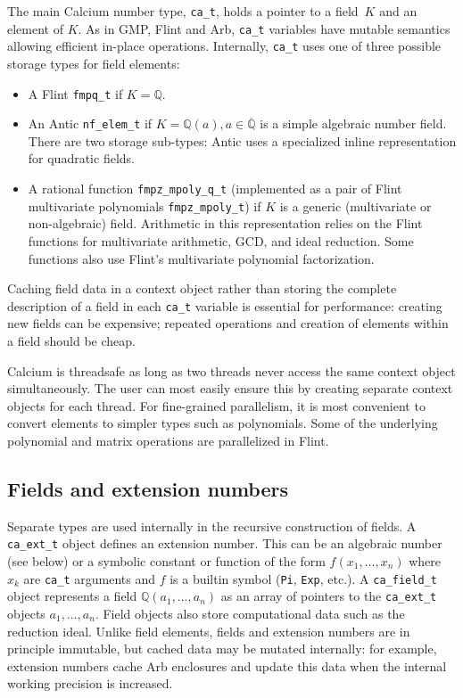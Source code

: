 \documentclass[11pt,a4paper]{article}
\begin{document}
The main Calcium number type, \texttt{ca\_t}, holds a pointer
to a field~$K$ and an element of $K$.
As in GMP, Flint and Arb, \texttt{ca\_t} variables have mutable semantics
allowing efficient in-place operations.
Internally, \texttt{ca\_t} uses one of three possible storage types
for field elements:
\begin{itemize}
\item A Flint \texttt{fmpq\_t} if $K = \mathbb{Q}$.
\item An Antic \texttt{nf\_elem\_t} if $K = \mathbb{Q}(a), a \in \overline{\mathbb{Q}}$ is a simple algebraic number field. There are two storage sub-types: Antic uses a specialized inline representation for quadratic fields.
\item A rational function \texttt{fmpz\_mpoly\_q\_t} (implemented as a pair of Flint multivariate polynomials \texttt{fmpz\_mpoly\_t}) if $K$ is a generic (multivariate or non-algebraic) field. Arithmetic in this representation relies on the Flint functions for multivariate arithmetic, GCD, and ideal reduction. Some functions also use Flint's multivariate polynomial factorization.
\end{itemize}

Caching field data in a context object rather than storing the
complete description of a field in each \texttt{ca\_t} variable
is essential for performance: creating new fields can be
expensive; repeated operations and creation of elements within a field
should be cheap.


Calcium is threadsafe as long as two threads never
access the same context object simultaneously. The user can most easily
ensure this by creating separate context objects for each thread.
For fine-grained parallelism, it is most convenient to
convert elements to simpler types such as polynomials.
Some of the underlying polynomial and matrix operations
are parallelized in Flint.


\subsection{Fields and extension numbers}

Separate types are used internally
in the recursive construction of fields.
A \texttt{ca\_ext\_t} object
defines an extension number.
This can be an algebraic number (see below)
or a symbolic constant or function of the form $f(x_1,\ldots,x_n)$
where $x_k$ are \texttt{ca\_t} arguments and $f$ is a builtin
symbol (\texttt{Pi}, \texttt{Exp}, etc.).
A \texttt{ca\_field\_t} object represents a field
$\mathbb{Q}(a_1,\ldots,a_n)$
as an array of pointers to the \texttt{ca\_ext\_t} objects
$a_1,\ldots,a_n$.
Field objects also store computational
data such as the reduction ideal.
Unlike field elements, fields and extension numbers are in principle immutable,
but cached data may be mutated internally: for example, extension numbers
cache Arb enclosures
and update this data when the internal working precision is increased.
\end{document}
